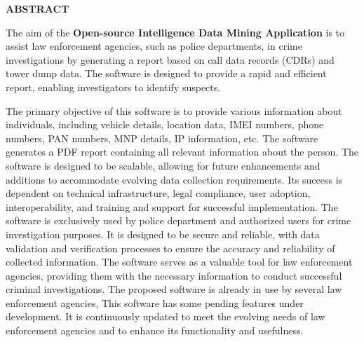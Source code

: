 \thispagestyle{plain}
\begin{center}
    \Large \textbf{\uppercase{Abstract}}
\end{center}

\vspace{3\baselineskip}

\vspace{1ex}


\justify

The aim of the \textbf{Open-source Intelligence Data Mining Application}  is to assist law enforcement agencies, such as police departments, in crime investigations by generating a report based on call data records (CDRs) and tower dump data. The software is designed to provide a rapid and efficient report, enabling investigators to identify suspects.

\justify
The primary objective of this software is to provide various information about individuals, including vehicle details, location data, IMEI numbers, phone numbers, PAN numbers, MNP details, IP information, etc. The software generates a PDF report containing all relevant information about the person.
\justify
The software is designed to be scalable, allowing for future enhancements and additions to accommodate evolving data collection requirements. Its success is dependent on technical infrastructure, legal compliance, user adoption, interoperability, and training and support for successful implementation.
\justify
The software is exclusively used by police department and authorized users for crime investigation purposes. It is designed to be secure and reliable, with data validation and verification processes to ensure the accuracy and reliability of collected information. The software serves as a valuable tool for law enforcement agencies, providing them with the necessary information to conduct successful criminal investigations.
\justify
The proposed software is already in use by several law enforcement agencies, This software has some pending features under development. It is continuously updated to meet the evolving needs of law enforcement agencies and to enhance its functionality and usefulness.
